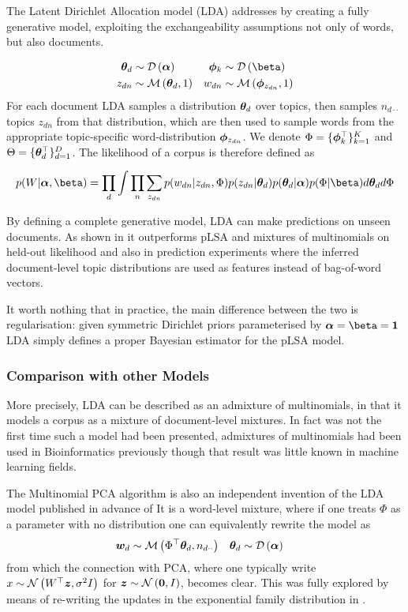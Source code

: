 The Latent Dirichlet Allocation model\cite{BleiNgJordan2003} (LDA) addresses by creating a fully generative model, exploiting the exchangeability assumptions not only of words, but also documents.

\begin{align}
\thd & \sim \dir{\vv{\alpha}} & \pk & \sim \dir{\vv{\beta}} \\
z_{dn} & \sim \muln{\thd}{1} & w_{dn} & \sim \muln{\vv{\phi}_{z_{dn}}}{1}
\end{align}
For each document LDA samples a distribution ${ \bm \theta_d }$ over topics, then samples $n_{d\cdot\cdot}$ topics $z_{dn}$ from that distribution, which are then used to sample words from the appropriate topic-specific word-distribution $\bm \phi_{z_{dn}}$. We denote $\Phi = \{ \bm \phi_k^\top \}_{k=1}^K$ and $\Theta = \{ \bm \theta_d^\top \}_{d=1}^D$. The likelihood of a corpus is therefore defined as

\begin{align}
p(W | \vv{\alpha}, \vv{\beta}) = \prod_d \int \prod_n \sum_{z_{dn}} p(w_{dn}|z_{dn}, \Phi)p(z_{dn}|\thd)p(\thd|\vv{\alpha})p(\Phi|\vv{\beta}) d\thd d\Phi
\end{align}

By defining a complete generative model, LDA can make predictions on unseen documents. As shown in \cite{BleiNgJordan2003} it outperforms pLSA and mixtures of multinomials on held-out likelihood and also in prediction experiments where the inferred document-level topic distributions are used as features instead of bag-of-word vectors.

It worth nothing that in practice, the main difference between the two is regularisation: given symmetric Dirichlet priors parameterised by $\vv{\alpha} = \vv{\beta} = \vv{1}$ LDA simply defines a proper Bayesian estimator for the pLSA model\cite{GiKa2003}.

\subsubsection{Comparison with other Models}
More precisely, LDA can be described as an admixture of multinomials, in that it models a corpus as a mixture of document-level mixtures. In fact \cite{BleiNgJordan2003} was not the first time such a model had been presented,  admixtures of multinomials had been used in Bioinformatics previously\cite{Pritchard2000} though that result was little known in machine learning fields. 

The Multinomial PCA algorithm\cite{Buntine2002} is also an independent invention of the LDA model published in advance of \cite{BleiNgJordan2003} It is a word-level mixture, where if one treats $\Phi$ as a parameter with no distribution one can equivalently rewrite the model as
\begin{align}
{  \bm w _d } & \sim \mathcal{M} \left( {\Phi^\top{  \bm \theta _d }},{n_{d\cdot\cdot}} \right) & { \bm \theta_d } & \sim \mathcal{D} \left( {\bm \alpha} \right)
\end{align}
from which the connection with PCA, where one typically write $x \sim \mathcal{N} \left( {W^\top\bm z}, {\sigma^2 I} \right)$ for $\bm z \sim \mathcal{N} \left( {\bm 0}, {I} \right)$, becomes clear. This was fully explored by means of re-writing the updates in the exponential family distribution in \cite{Buntine2002}.

